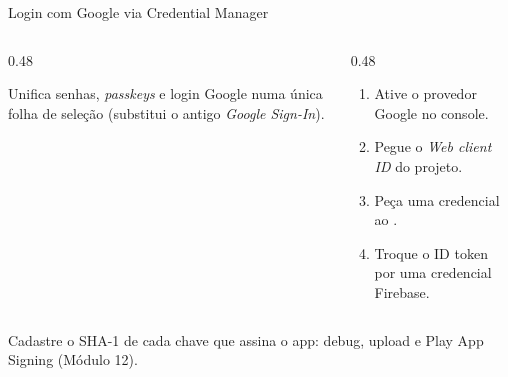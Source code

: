\documentclass[aspectratio=169,10pt]{beamer}
\begin{document}
\begin{frame}{Login com Google via Credential Manager}
  \begin{center}
  \end{center}
  \begin{columns}[T]
    \begin{column}{0.48\textwidth}
      \begin{conceito}
        Unifica senhas, \emph{passkeys} e login Google numa única folha de seleção (substitui o antigo \emph{Google Sign-In}).
      \end{conceito}
    \end{column}
    \begin{column}{0.48\textwidth}
      \begin{dica}[Passos]
        \begin{enumerate}
          \item Ative o provedor Google no console.
          \item Pegue o \emph{Web client ID} do projeto.
          \item Peça uma credencial  ao .
          \item Troque o ID token por uma credencial Firebase.
        \end{enumerate}
      \end{dica}
    \end{column}
  \end{columns}
  \begin{atencao}
    Cadastre o SHA-1 de cada chave que assina o app: debug, upload e Play App Signing (Módulo 12).
  \end{atencao}
\end{frame}
\end{document}
